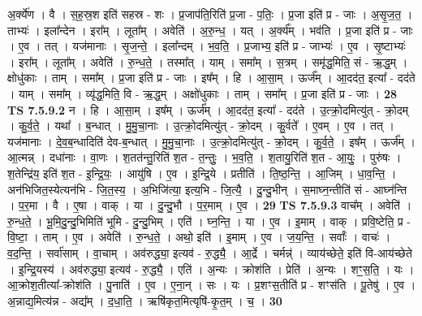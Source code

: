 \documentclass[17pt]{extarticle}
\begin{document}
                  अ॒र्क्ये॑ण । वै । स॒ह॒स्र॒श इति॑ सहस्र - शः । प्र॒जाप॑ति॒रिति॑ प्र॒जा - प॒तिः॒ । प्र॒जा इति॑ प्र - जाः । अ॒सृ॒ज॒त॒ । ताभ्यः॑ । इला᳚न्देन । इरा᳚म् । लूता᳚म् । अवेति॑ । अ॒रु॒न्ध॒ । यत् । अ॒र्क्य᳚म् । भव॑ति । प्र॒जा इति॑ प्र - जाः । ए॒व । तत् । यज॑मानाः । सृ॒ज॒न्ते॒ । इला᳚न्दम् । भ॒व॒ति॒ । प्र॒जाभ्य॒ इति॑ प्र - जाभ्यः॑ । ए॒व । सृ॒ष्टाभ्यः॑ । इरा᳚म् । लूता᳚म् । अवेति॑ । रु॒न्ध॒ते॒ । तस्मा᳚त् । याम् । समा᳚म् । स॒त्रम् । समृ॑द्ध॒मिति॒ सं - ऋ॒द्ध॒म् । क्षोधु॑काः । ताम् । समा᳚म् । प्र॒जा इति॑ प्र - जाः । इष᳚म् । हि । आ॒सा॒म् । ऊर्ज᳚म् । आ॒दद॑त॒ इत्या᳚ - दद॑ते । याम् । समा᳚म् । व्यृ॑द्ध॒मिति॒ वि - ऋ॒द्ध॒म् । अक्षो॑धुकाः । ताम् । समा᳚म् । प्र॒जा इति॑ प्र - जाः । \textbf{  28} \newline
                  \newline
                                \textbf{ TS 7.5.9.2} \newline
                  न । हि । आ॒सा॒म् । इष᳚म् । ऊर्ज᳚म् । आ॒दद॑त॒ इत्या᳚ - दद॑ते । उ॒त्क्रो॒दमित्यु॑त् - क्रो॒दम् । कु॒र्व॒ते॒ । यथा᳚ । ब॒न्धात् । मु॒मु॒चा॒नाः । उ॒त्क्रो॒दमित्यु॑त् - क्रो॒दम् । कु॒र्वते᳚ । ए॒वम् । ए॒व । तत् । यज॑मानाः । दे॒व॒ब॒न्धादिति॑ देव-ब॒न्धात् । मु॒मु॒चा॒नाः । उ॒त्क्रो॒दमित्यु॑त् - क्रो॒दम् । कु॒र्व॒ते॒ । इष᳚म् । ऊर्ज᳚म् । आ॒त्मन्न् । दधा॑नाः । वा॒णः । श॒तत॑न्तु॒रिति॑ श॒त - त॒न्तुः॒ । भ॒व॒ति॒ । श॒तायु॒रिति॑ श॒त - आ॒युः॒ । पुरु॑षः । श॒तेन्द्रि॑य॒ इति॑ श॒त - इ॒न्द्रि॒यः॒ । आयु॑षि । ए॒व । इ॒न्द्रि॒ये । प्रतीति॑ । ति॒ष्ठ॒न्ति॒ । आ॒जिम् । धा॒व॒न्ति॒ । अन॑भिजित॒स्येत्यन॑भि - जि॒त॒स्य॒ । अ॒भिजि॑त्या॒ इत्य॒भि - जि॒त्यै॒ । दु॒न्दु॒भीन् । स॒माघ्न॒न्तीति॑ सं - आघ्न॑न्ति । प॒र॒मा । वै । ए॒षा । वाक् । या । दु॒न्दु॒भौ । प॒र॒माम् । ए॒व । \textbf{  29} \newline
                  \newline
                                \textbf{ TS 7.5.9.3} \newline
                  वाच᳚म् । अवेति॑ । रु॒न्ध॒ते॒ । भू॒मि॒दु॒न्दु॒भिमिति॑ भूमि - दु॒न्दु॒भिम् । एति॑ । घ्न॒न्ति॒ । या । ए॒व । इ॒माम् । वाक् । प्रवि॒ष्टेति॒ प्र - वि॒ष्टा॒ । ताम् । ए॒व । अवेति॑ । रु॒न्ध॒ते॒ । अथो॒ इति॑ । इ॒माम् । ए॒व । ज॒य॒न्ति॒ । सर्वाः᳚ । वाचः॑ । व॒द॒न्ति॒ । सर्वा॑साम् । वा॒चाम् । अव॑रुद्ध्या॒ इत्यव॑ - रु॒द्ध्यै॒ । आ॒र्द्रे । चर्मन्न्॑ । व्याय॑च्छेते॒ इति॑ वि-आय॑च्छेते । इ॒न्द्रि॒यस्य॑ । अव॑रुद्ध्या॒ इत्यव॑ - रु॒द्ध्यै॒ । एति॑ । अ॒न्यः । क्रोश॑ति । प्रेति॑ । अ॒न्यः । शꣳ॒॒स॒ति॒ । यः । आ॒क्रोश॒तीत्या᳚-क्रोश॑ति । पु॒नाति॑ । ए॒व । ए॒ना॒न् । सः । यः । प्र॒शꣳस॒तीति॑ प्र - शꣳस॑ति । पू॒तेषु॑ । ए॒व । अ॒न्नाद्य॒मित्य॑न्न - अद्य᳚म् । द॒धा॒ति॒ । ऋषि॑कृत॒मित्यृषि॑-कृ॒त॒म् । च॒ । \textbf{  30} \newline
\end{document}
